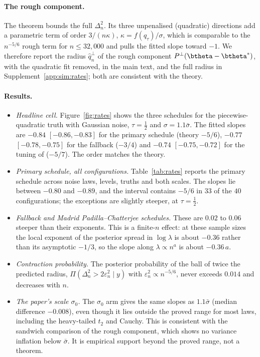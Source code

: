 \paragraph{The rough component.}
The theorem bounds the full $\Delta_n^2$. Its three unpenalised (quadratic) directions add a parametric term of order $3/(n\kappa)$, $\kappa=f(q_\tau)/\sigma$, which is comparable to the $n^{-5/6}$ rough term for $n\le 32{,}000$ and pulls the fitted slope toward $-1$. We therefore report the radius $\hat q_n^{\perp}$ of the rough component $P^{\perp}(\btheta-\btheta^*)$, with the quadratic fit removed, in the main text, and the full radius in Supplement~\ref{app:sim:rates}; both are consistent with the theory.

\paragraph{Results.}
\begin{itemize}
 \item \emph{Headline cell.} Figure~\ref{fig:rates} shows the three schedules for the piecewise-quadratic truth with Gaussian noise, $\tau=\tfrac12$ and $\sigma=1.1\bar\sigma$. The fitted slopes are $-0.84$ $[-0.86,-0.83]$ for the primary schedule (theory $-5/6$), $-0.77$ $[-0.78,-0.75]$ for the fallback ($-3/4$) and $-0.74$ $[-0.75,-0.72]$ for the tuning of \citet{madrid2022risk} ($-5/7$). The order matches the theory.
 \item \emph{Primary schedule, all configurations.} Table~\ref{tab:rates} reports the primary schedule across noise laws, levels, truths and both scales. The slopes lie between $-0.80$ and $-0.89$, and the interval contains $-5/6$ in $33$ of the $40$ configurations; the exceptions are slightly steeper, at $\tau=\tfrac12$.
 \item \emph{Fallback and Madrid Padilla--Chatterjee schedules.} These are $0.02$ to $0.06$ steeper than their exponents. This is a finite-$n$ effect: at these sample sizes the local exponent of the posterior spread in $\log\lambda$ is about $-0.36$ rather than its asymptotic $-1/3$, so the slope along $\lambda\propto n^{a}$ is about $-0.36\,a$.
 \item \emph{Contraction probability.} The posterior probability of the ball of twice the predicted radius, $\Pi(\Delta_n^2>2\varepsilon_n^2\mid y)$ with $\varepsilon_n^2\propto n^{-5/6}$, never exceeds $0.014$ and decreases with $n$.
 \item \emph{The paper's scale $\sigma_0$.} The $\sigma_0$ arm gives the same slopes as $1.1\bar\sigma$ (median difference $-0.008$), even though it lies outside the proved range for most laws, including the heavy-tailed $t_2$ and Cauchy. This is consistent with the sandwich comparison of the rough component, which shows no variance inflation below $\bar\sigma$. It is empirical support beyond the proved range, not a theorem.
\end{itemize}

